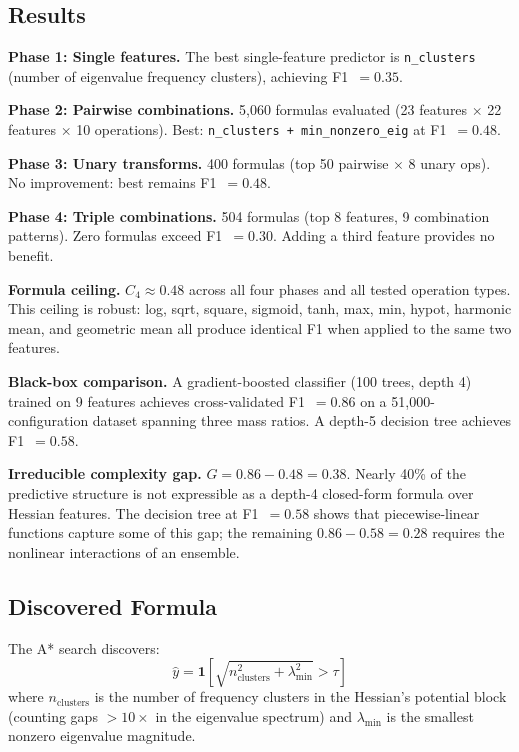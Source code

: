 \documentclass[11pt,a4paper]{article}
\begin{document}
\subsection{Results}

\textbf{Phase 1: Single features.} The best single-feature predictor
is \texttt{n\_clusters} (number of eigenvalue frequency clusters),
achieving F1~$= 0.35$.

\textbf{Phase 2: Pairwise combinations.} 5,060 formulas evaluated
(23 features $\times$ 22 features $\times$ 10 operations). Best:
\texttt{n\_clusters + min\_nonzero\_eig} at F1~$= 0.48$.

\textbf{Phase 3: Unary transforms.} 400 formulas (top 50 pairwise
$\times$ 8 unary ops). No improvement: best remains F1~$= 0.48$.

\textbf{Phase 4: Triple combinations.} 504 formulas (top 8 features,
9 combination patterns). Zero formulas exceed F1~$= 0.30$. Adding
a third feature provides no benefit.

\textbf{Formula ceiling.} $C_4 \approx 0.48$ across all four phases
and all tested operation types. This ceiling is robust: log, sqrt,
square, sigmoid, tanh, max, min, hypot, harmonic mean, and geometric
mean all produce identical F1 when applied to the same two features.

\textbf{Black-box comparison.} A gradient-boosted classifier (100
trees, depth 4) trained on 9 features achieves cross-validated
F1~$= 0.86$ on a 51,000-configuration dataset spanning three mass
ratios. A depth-5 decision tree achieves F1~$= 0.58$.

\textbf{Irreducible complexity gap.} $G = 0.86 - 0.48 = 0.38$.
Nearly 40\% of the predictive structure is not expressible as a
depth-4 closed-form formula over Hessian features. The decision tree
at F1~$= 0.58$ shows that piecewise-linear functions capture some
of this gap; the remaining $0.86 - 0.58 = 0.28$ requires the
nonlinear interactions of an ensemble.

\subsection{Discovered Formula}

The A* search discovers:
\begin{equation}
\hat{y} = \mathbf{1}\!\left[
\sqrt{n_\mathrm{clusters}^2 + \lambda_\mathrm{min}^2} > \tau
\right]
\label{eq:discovered}
\end{equation}
where $n_\mathrm{clusters}$ is the number of frequency clusters
in the Hessian's potential block (counting gaps $> 10\times$ in the
eigenvalue spectrum) and $\lambda_\mathrm{min}$ is the smallest
nonzero eigenvalue magnitude.
\end{document}
